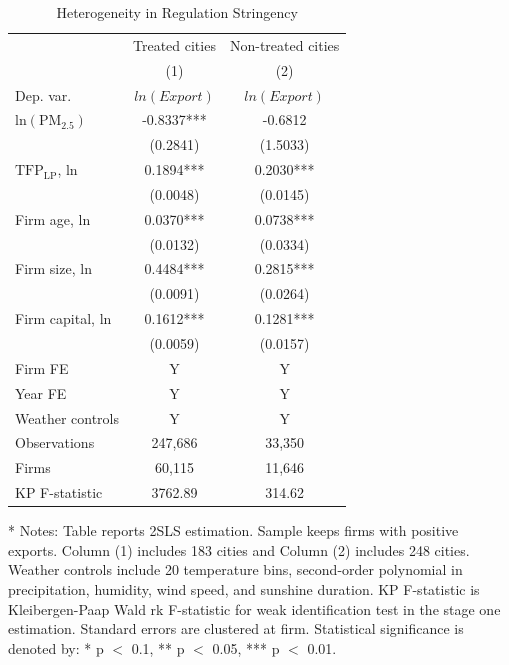 \documentclass[12pt]{article}
\begin{document}
     \begin{table}[H]\centering
     \caption{Heterogeneity in Regulation Stringency} \label{tab:hetero_cost}
      \footnotesize
       \begin{tabular}{l*{2}{c}}
      \hline\hline
      &\multicolumn{1}{c}{Treated cities}&\multicolumn{1}{c}{Non-treated cities}\\
      &\multicolumn{1}{c}{(1)}&\multicolumn{1}{c}{(2)}\\
      Dep. var. &\multicolumn{1}{c}{$ln(Export)$}&\multicolumn{1}{c}{$ln(Export)$}\\
      \hline

      $\mathrm{ln(PM_{2.5})}$           &-0.8337***&-0.6812\\
                                        &(0.2841)&(1.5033)\\
     $\mathrm{TFP_{LP}}$, ln            &0.1894***&0.2030***\\
                                        &(0.0048)&(0.0145)\\
      Firm age, ln                      &0.0370***&0.0738***\\
                                        &(0.0132) &(0.0334)\\
      Firm size, ln                     &0.4484***&0.2815***\\
                                        &(0.0091)&(0.0264)\\
    Firm capital, ln                    &0.1612***&0.1281***\\
                                        &(0.0059)&(0.0157)\\
    \hline
      Firm FE         &Y&Y\\
      Year FE         &Y&Y\\
      Weather controls &Y&Y\\
    \hline
      Observations	           &247,686&33,350 \\
      Firms                      &60,115&11,646\\

      KP F-statistic	          &3762.89&314.62\\
      \hline\hline
  \end{tabular}
  \begin{tablenotes}
      \item[*] \small Notes: Table reports 2SLS estimation. Sample keeps firms with positive exports. Column (1) includes 183 cities and Column (2) includes 248 cities. Weather controls include 20 temperature bins, second-order polynomial in precipitation, humidity, wind speed, and sunshine duration. KP F-statistic is Kleibergen-Paap Wald rk F-statistic for weak identification test in the stage one estimation. Standard errors are clustered at firm. Statistical significance is denoted by: * p $<$ 0.1, ** p $<$ 0.05, *** p $<$ 0.01.
    \end{tablenotes}
  \end{table}
\end{document}
